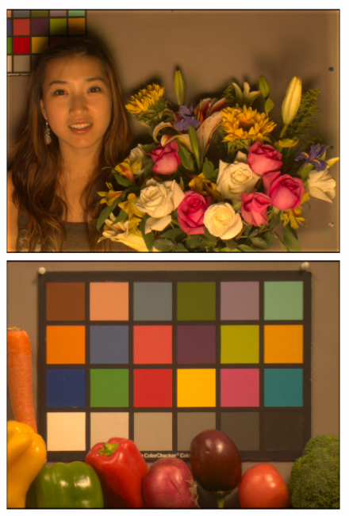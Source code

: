 \documentclass[]{spie}
\begin{document}
\begin{figure}[t]
\begin{center}
\begin{minipage}[b]{0.245\textwidth}
 \includegraphics[width=\textwidth]{Fig3/srgbI_AsianFemaleWithFlowers_RGBW1_Tungsten1_opt2}
 \includegraphics[width=\textwidth]{Fig3/srgbI_Vegetables_RGBW1_Tungsten1_opt2}
 \centering\small{}
\end{minipage}
\begin{minipage}[b]{0.245\textwidth}

\end{minipage}
\end{center}
\end{figure}
\end{document}
